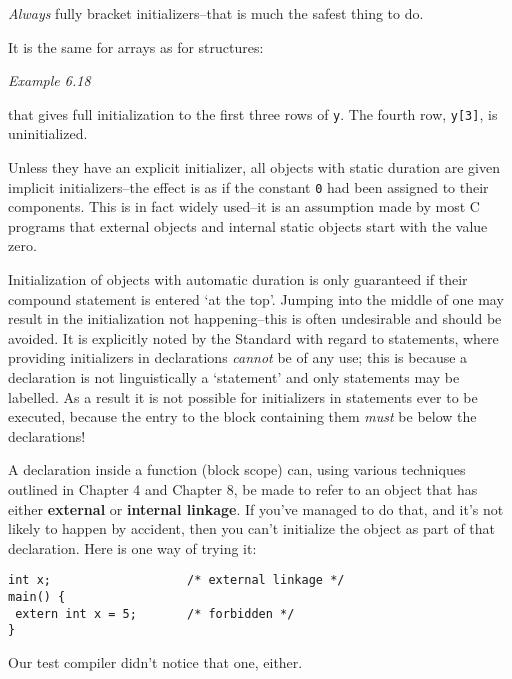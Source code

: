    \textit{Always} fully bracket initializers--that is much the safest
    thing to do.


   It is the same for arrays as for structures:


   \begin{center}\textit{Example 6.18}\end{center}


   that gives full initialization to the first three rows of \texttt{y}.
    The fourth row, \texttt{y[3]}, is uninitialized.


   Unless they have an explicit initializer, all objects with static
    duration are given implicit initializers--the effect is as if the
    constant \texttt{0} had been assigned to their components. This is in
    fact widely used--it is an assumption made by most C programs that
    external objects and internal static objects start with the value zero.


   Initialization of objects with automatic duration is only guaranteed if
    their compound statement is entered `at the top'. Jumping into the
    middle of one may result in the initialization not happening--this is
    often undesirable and should be avoided. It is explicitly noted by the
    Standard with regard to \switch{} statements, where providing
    initializers in declarations \textit{cannot} be of any use; this is because
    a declaration is not linguistically a `statement' and only statements
    may be labelled. As a result it is not possible for initializers in
    \switch{} statements ever to be executed, because the entry to
    the block containing them \textit{must} be below the declarations!


   A declaration inside a function (block scope) can, using various
    techniques outlined in Chapter 4 and Chapter 8,
    be made to refer to an object that has either \textbf{external} or
    \textbf{internal linkage}. If you've managed to do that, and it's not
    likely to happen by accident, then you can't initialize the object as part
    of that declaration. Here is one way of trying it:


   \begin{Verbatim}
int x;                   /* external linkage */
main() {
 extern int x = 5;       /* forbidden */
}
\end{Verbatim}

   Our test compiler didn't notice that one, either.


